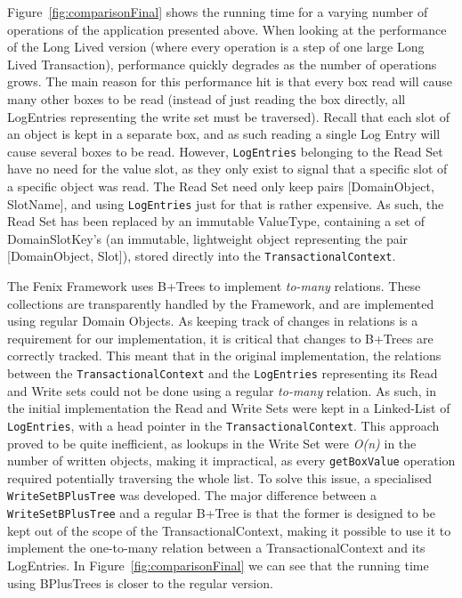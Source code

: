 \documentclass{llncs}
\begin{document}
Figure~\ref{fig:comparisonFinal} shows the running time for a varying
number of operations of the application presented above.  When looking
at the performance of the Long Lived version (where every operation is
a step of one large Long Lived Transaction), performance quickly
degrades as the number of operations grows. The main reason for this
performance hit is that every box read will cause many other boxes to
be read (instead of just reading the box directly, all LogEntries
representing the write set must be traversed). Recall that each slot
of an object is kept in a separate box, and as such reading a single
Log Entry will cause several boxes to be read. However,
\texttt{LogEntries} belonging to the Read Set have no need for the
value slot, as they only exist to signal that a specific slot of a
specific object was read. The Read Set need only keep pairs
[DomainObject, SlotName], and using \texttt{LogEntries} just for that
is rather expensive. As such, the Read Set has been replaced by an
immutable ValueType, containing a set of DomainSlotKey's (an
immutable, lightweight object representing the pair [DomainObject,
Slot]), stored directly into the \texttt{TransactionalContext}.

The Fenix Framework uses B+Trees to implement {\it to-many}
relations. These collections are transparently handled by the
Framework, and are implemented using regular Domain Objects. As
keeping track of changes in relations is a requirement for our
implementation, it is critical that changes to B+Trees are correctly
tracked. This meant that in the original implementation, the relations
between the \texttt{TransactionalContext} and the \texttt{LogEntries}
representing its Read and Write sets could not be done using a regular
{\it to-many} relation. As such, in the initial implementation the
Read and Write Sets were kept in a Linked-List of \texttt{LogEntries},
with a head pointer in the \texttt{TransactionalContext}.  This
approach proved to be quite inefficient, as lookups in the Write Set
were {\it O(n)} in the number of written objects, making it
impractical, as every \texttt{getBoxValue} operation required
potentially traversing the whole list. To solve this issue, a
specialised \texttt{WriteSetBPlusTree} was developed. The major
difference between a \texttt{WriteSetBPlusTree} and a regular B+Tree
is that the former is designed to be kept out of the scope of the
TransactionalContext, making it possible to use it to implement the
one-to-many relation between a TransactionalContext and its
LogEntries. In Figure~\ref{fig:comparisonFinal} we can see that the
running time using BPlusTrees is closer to the regular
version. 
\end{document}
